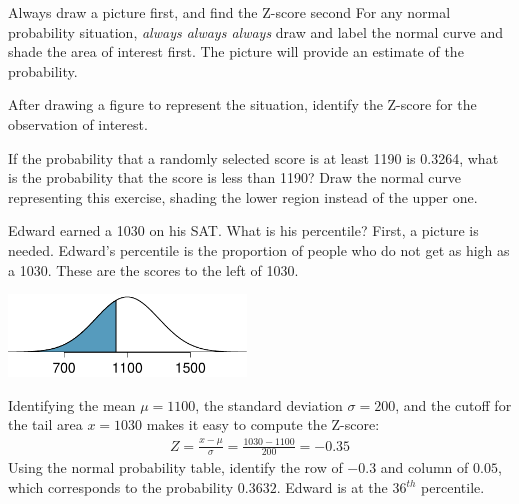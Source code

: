 \begin{onebox}{Always draw a picture first, and find the Z-score second}
For any normal probability situation, \emph{always always always} draw and label the normal curve and shade the area of interest first. The picture will provide an estimate of the probability. \vspace{3mm}

After drawing a figure to represent the situation, identify the Z-score for the observation of interest.\vspace{1mm}\end{onebox}

\begin{exercisewrap}
\begin{nexercise}
If the probability that a randomly selected score is at least 1190 is 0.3264, what is the probability that the score is less than 1190? Draw the normal curve representing this exercise, shading the lower region instead of the upper one.\footnotemark
\end{nexercise}
\end{exercisewrap}

\D{\newpage}

\begin{examplewrap}
\begin{nexample}{Edward earned a 1030 on his SAT. What is his percentile?} \label{edwardSatBelow1030}
First, a picture is needed. Edward's percentile is the proportion of people who do not get as high as a 1030. These are the scores to the left of 1030.
\begin{center}
\includegraphics[height=22mm]{ch_distributions/figures/satBelow1030/satBelow1030}
\end{center}
Identifying the mean $\mu=1100$, the standard deviation $\sigma=200$, and the cutoff for the tail area $x=1030$ makes it easy to compute the Z-score:
\begin{eqnarray*}
Z = \frac{x - \mu}{\sigma} = \frac{1030 - 1100}{200} = -0.35
\end{eqnarray*}
Using the normal probability table, identify the row of $-0.3$ and column of $0.05$, which corresponds to the probability $0.3632$. Edward is at the $36^{th}$ percentile.
\end{nexample}
\end{examplewrap}

